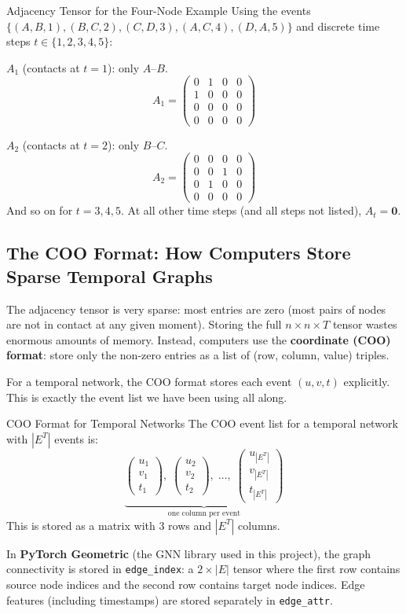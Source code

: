 \begin{examplebox}{Adjacency Tensor for the Four-Node Example}
Using the events $\{(A,B,1), (B,C,2), (C,D,3), (A,C,4), (D,A,5)\}$ and discrete time steps
$t \in \{1,2,3,4,5\}$:

\medskip
\noindent$A_1$ (contacts at $t=1$): only $A$--$B$.
\[
A_1 = \begin{pmatrix} 0&1&0&0\\ 1&0&0&0\\ 0&0&0&0\\ 0&0&0&0 \end{pmatrix}
\]

\noindent$A_2$ (contacts at $t=2$): only $B$--$C$.
\[
A_2 = \begin{pmatrix} 0&0&0&0\\ 0&0&1&0\\ 0&1&0&0\\ 0&0&0&0 \end{pmatrix}
\]
And so on for $t=3,4,5$. At all other time steps (and all steps not listed), $A_t = \mathbf{0}$.
\end{examplebox}

\subsection{The COO Format: How Computers Store Sparse Temporal Graphs}

The adjacency tensor is very sparse: most entries are zero (most pairs of nodes are not in
contact at any given moment). Storing the full $n \times n \times T$ tensor wastes enormous
amounts of memory. Instead, computers use the \textbf{coordinate (COO) format}: store only the
non-zero entries as a list of (row, column, value) triples.

For a temporal network, the COO format stores each event $(u, v, t)$ explicitly. This is
exactly the event list we have been using all along.

\begin{conceptbox}{COO Format for Temporal Networks}
The COO event list for a temporal network with $|E^T|$ events is:
\[
\underbrace{\begin{pmatrix} u_1 \\ v_1 \\ t_1 \end{pmatrix},\;
\begin{pmatrix} u_2 \\ v_2 \\ t_2 \end{pmatrix},\;
\ldots,\;
\begin{pmatrix} u_{|E^T|} \\ v_{|E^T|} \\ t_{|E^T|} \end{pmatrix}}_{\text{one column per event}}
\]
This is stored as a matrix with 3 rows and $|E^T|$ columns.

In \textbf{PyTorch Geometric} (the GNN library used in this project), the graph connectivity is
stored in \texttt{edge\_index}: a $2 \times |E|$ tensor where the first row contains source
node indices and the second row contains target node indices. Edge features (including
timestamps) are stored separately in \texttt{edge\_attr}.
\end{conceptbox}

